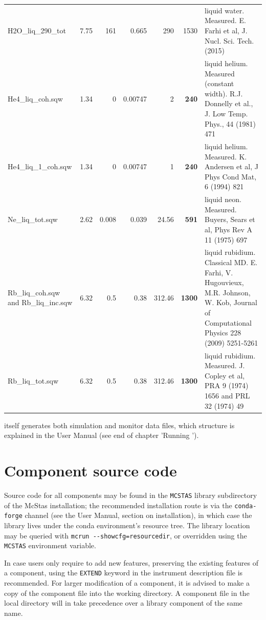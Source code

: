 {\begin{longtable}{|p{}|rrr|rr|p{}|}
H2O\_liq\_290\_tot                    &7.75       & 161      &0.665     &290       &1530  & liquid water. Measured. E. Farhi et al, J. Nucl. Sci. Tech. (2015) \\
He4\_liq\_coh.sqw                     & 1.34      & 0        &0.00747   &2         &\textbf{240}   & liquid helium. Measured (constant width). R.J. Donnelly et al., J. Low Temp. Phys., 44 (1981) 471\\
He4\_liq\_1\_coh.sqw                  & 1.34      & 0        &0.00747   &1         &\textbf{240}   & liquid helium. Measured. K. Andersen et al, J Phys Cond Mat, 6 (1994) 821\\
Ne\_liq\_tot.sqw                      & 2.62      & 0.008    &0.039     &24.56     &\textbf{591}   & liquid neon. Measured. Buyers, Sears et al, Phys Rev A 11 (1975) 697\\
Rb\_liq\_coh.sqw and Rb\_liq\_inc.sqw & 6.32      & 0.5      &0.38      &312.46    &\textbf{1300}  & liquid rubidium. Classical MD. E. Farhi, V. Hugouvieux, M.R. Johnson, W. Kob, Journal of Computational Physics 228 (2009) 5251-5261 \\
Rb\_liq\_tot.sqw                      & 6.32      & 0.5      &0.38      &312.46    &\textbf{1300}  & liquid rubidium. Measured. J. Copley et al, PRA 9 (1974) 1656 and PRL 32 (1974) 49 \\
\end{longtable}
}

\MCS itself generates both simulation and monitor data files, which structure is explained in the User Manual (see end of chapter 'Running \MCS ').

\section{Component source code}
Source code for all components may be found in the \verb+MCSTAS+ library
subdirectory of the McStas installation; the recommended installation route
is via the \texttt{conda-forge} channel (see the User Manual, section on
installation), in which case the library lives under the conda environment's
resource tree. The library location may be queried with
\verb+mcrun --showcfg=resourcedir+, or overridden using the
\verb+MCSTAS+ environment variable.

In case users only require to add new features, preserving the existing features of a component,
using the \verb+EXTEND+ keyword in the instrument description file is recommended. For larger modification of a component, it is advised to make a copy
of the component file into the working directory.
A component file in the local directory will in \MCS take precedence over
a library component of the same name.

